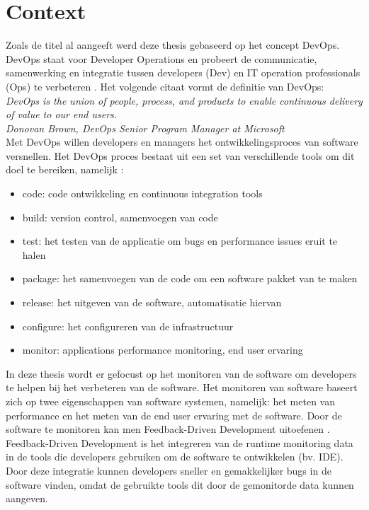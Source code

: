 \chapter{Context}
Zoals de titel al aangeeft werd deze thesis gebaseerd op het concept DevOps. DevOps staat voor Developer Operations en probeert de communicatie, samenwerking en integratie tussen developers (Dev) en IT operation professionals (Ops) te verbeteren \cite{waller2015including}. Het volgende citaat vormt de definitie van DevOps: \\

\textit{DevOps is the union of people, process, and products to enable continuous delivery of value to our end users.\\
Donovan Brown, DevOps Senior Program Manager at Microsoft} \cite{de2016devops}\\

Met DevOps willen developers en managers het ontwikkelingsproces van software versnellen. Het DevOps proces bestaat uit een set van verschillende tools om dit doel te bereiken, namelijk \cite{DevOpsWiki}:
\begin{itemize}
\item code: code ontwikkeling en continuous integration tools
\item build: version control, samenvoegen van code
\item test: het testen van de applicatie om bugs en performance issues eruit te halen
\item package: het samenvoegen van de code om een software pakket van te maken
\item release: het uitgeven van de software, automatisatie hiervan
\item configure: het configureren van de infrastructuur
\item monitor: applications performance monitoring, end user ervaring
\end{itemize}

In deze thesis wordt er gefocust op het monitoren van de software om developers te helpen bij het verbeteren van de software. Het monitoren van software baseert zich op twee eigenschappen van software systemen, namelijk: het meten van performance en het meten van de end user ervaring met de software. Door de software te monitoren kan men Feedback-Driven Development uitoefenen \cite{cito2015runtime}. Feedback-Driven Development is het integreren van de runtime monitoring data in de tools die developers gebruiken om de software te ontwikkelen (bv. IDE). Door deze integratie kunnen developers sneller en gemakkelijker bugs in de software vinden, omdat de gebruikte tools dit door de gemonitorde data kunnen aangeven.\\

